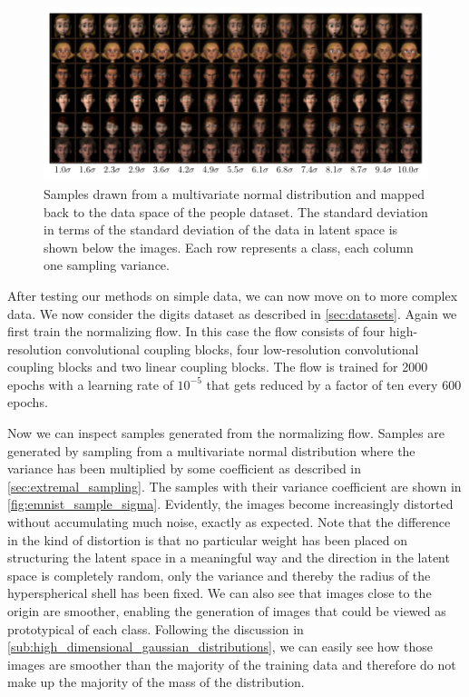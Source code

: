 \begin{figure}[htpb]
	\centering
        \includegraphics{figures/samples/samples_increasing_distance_FERG_people.pdf}
	\caption{Samples drawn from a multivariate normal distribution and
		mapped back to the data space of the people dataset. The standard
		deviation in terms of the standard deviation of the data in latent
		space is shown below the images. Each row represents a class, each
		column one sampling variance.}%
	\label{fig:ferg_sample_sigma}
\end{figure}

After testing our methods on simple data, we can now move on to more complex
data. We now consider the digits dataset as described in
\autoref{sec:datasets}. Again we first train the normalizing flow. In this case
the flow consists of four high-resolution convolutional coupling blocks, four
low-resolution convolutional coupling blocks and two linear coupling blocks.
The flow is trained for 2000 epochs with a learning rate of $10^{-5}$ that gets
reduced by a factor of ten every 600 epochs.

Now we can inspect samples generated from the normalizing flow. Samples are
generated by sampling from a multivariate normal distribution where the
variance has been multiplied by some coefficient as described in
\autoref{sec:extremal_sampling}. The samples with their variance coefficient
are shown in \autoref{fig:emnist_sample_sigma}. Evidently, the images
become increasingly distorted without accumulating much noise, exactly as
expected. Note that the difference in the kind of distortion is that no
particular weight has been placed on structuring the latent space in a
meaningful way and the direction in the latent space is completely random, only
the variance and thereby the radius of the hyperspherical shell has been fixed.
We can also see that images close to the origin are smoother, enabling the
generation of images that could be viewed as prototypical of each class.
Following the discussion in
\autoref{sub:high_dimensional_gaussian_distributions}, we can
easily see how those images are smoother than the majority of the training data
and therefore do not make up the majority of the mass of the distribution.

